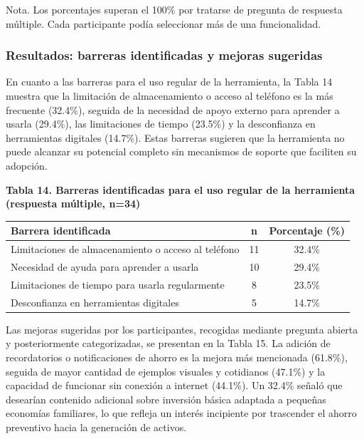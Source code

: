 \documentclass[12pt,letterpaper]{article}
\begin{document}
Nota. Los porcentajes superan el 100\% por tratarse de pregunta de respuesta múltiple. Cada participante podía seleccionar más de una funcionalidad.

\subsubsection{\texorpdfstring{\textbf{Resultados: barreras identificadas y mejoras sugeridas}}{Resultados: barreras identificadas y mejoras sugeridas}}\label{resultados-barreras-identificadas-y-mejoras-sugeridas}

En cuanto a las barreras para el uso regular de la herramienta, la Tabla 14 muestra que la limitación de almacenamiento o acceso al teléfono es la más frecuente (32.4\%), seguida de la necesidad de apoyo externo para aprender a usarla (29.4\%), las limitaciones de tiempo (23.5\%) y la desconfianza en herramientas digitales (14.7\%). Estas barreras sugieren que la herramienta no puede alcanzar su potencial completo sin mecanismos de soporte que faciliten su adopción.

\textbf{Tabla 14. Barreras identificadas para el uso regular de la herramienta (respuesta múltiple, n=34)}

\begin{longtable}[]{@{}lcc@{}}
\toprule\noalign{}
Barrera identificada & n & Porcentaje (\%) \\
\midrule\noalign{}
\endhead
\bottomrule\noalign{}
\endlastfoot
Limitaciones de almacenamiento o acceso al teléfono & 11 & 32.4\% \\
Necesidad de ayuda para aprender a usarla & 10 & 29.4\% \\
Limitaciones de tiempo para usarla regularmente & 8 & 23.5\% \\
Desconfianza en herramientas digitales & 5 & 14.7\% \\
\end{longtable}

Las mejoras sugeridas por los participantes, recogidas mediante pregunta abierta y posteriormente categorizadas, se presentan en la Tabla 15. La adición de recordatorios o notificaciones de ahorro es la mejora más mencionada (61.8\%), seguida de mayor cantidad de ejemplos visuales y cotidianos (47.1\%) y la capacidad de funcionar sin conexión a internet (44.1\%). Un 32.4\% señaló que desearían contenido adicional sobre inversión básica adaptada a pequeñas economías familiares, lo que refleja un interés incipiente por trascender el ahorro preventivo hacia la generación de activos.
\end{document}
